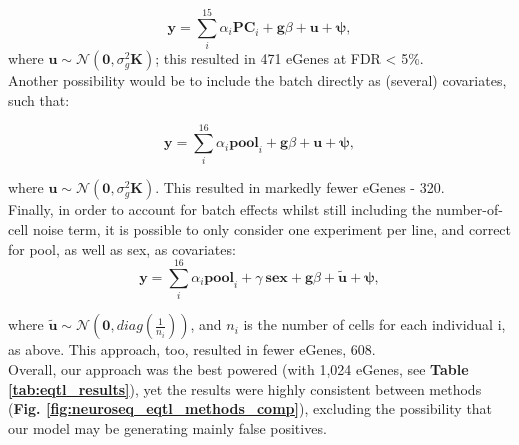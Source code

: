\begin{equation}\label{eq:neuroseq_pcs_kinship}
    \mathbf{y} = \sum_i^{15}\alpha_i \mathbf{PC}_i + \mathbf{g}\beta + \mathbf{u} + \boldsymbol{\psi}, 
\end{equation}
where $ \mathbf{u} \sim \mathcal{N}(\mathbf{0},\sigma_g^2\mathbf{K})$;
this resulted in 471 eGenes at FDR < 5\%.\\

Another possibility would be to include the batch directly as (several) covariates, 
such that:

\begin{equation}\label{eq:neuroseq_batch_kinship}
    \mathbf{y} = \sum_i^{16}\alpha_i \mathbf{pool}_i + 
    \mathbf{g}\beta + \mathbf{u} + \boldsymbol{\psi}, 
\end{equation}

where $ \mathbf{u} \sim \mathcal{N}(\mathbf{0},\sigma_g^2\mathbf{K})$.
This resulted in markedly fewer eGenes - 320.\\

Finally, in order to account for batch effects whilst still including the number-of-cell noise term, it is possible to only consider one experiment per line, and correct for pool, as well as sex, as covariates:
\begin{equation}\label{eq:neuroseq_batch_ncell}
    \mathbf{y} = \sum_i^{16}\alpha_i \mathbf{pool}_i + \gamma \ \mathbf{sex} + \mathbf{g}\beta + \tilde{\mathbf{u}} + \boldsymbol{\psi}, 
\end{equation}

where $\tilde{\mathbf{u}} \sim \mathcal{N}(\mathbf{0}, diag(\frac{1}{n_i}))$, and $n_i$ is the number of cells for each individual i, as above.
This approach, too, resulted in fewer eGenes, 608.\\

Overall, our approach was the best powered (with 1,024 eGenes, see \textbf{Table \ref{tab:eqtl_results}}), yet the results were highly consistent between methods (\textbf{Fig. \ref{fig:neuroseq_eqtl_methods_comp}}), excluding the possibility that our model may be generating mainly false positives.

